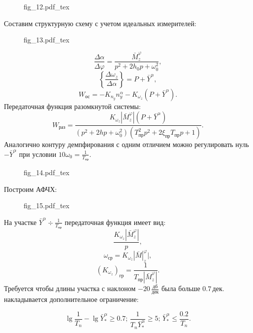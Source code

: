 \documentclass{article}
\begin{document}
\begin{figure}[H]
    \centering
    {fig_12.pdf_tex}
\end{figure}
Составим структурную схему с учетом идеальных измерителей:
\begin{figure}[H]
    \centering
    {fig_13.pdf_tex}
\end{figure}
\[
    \frac{\Delta \alpha}{\Delta \varphi} = \frac{\bar{M}_z^\varphi}{p^2 + 2 h_0
    p + \omega_0^2},
\]
\[
    \left\{ \frac{\Delta \omega_z}{\Delta \alpha}\right\} = P + \bar{Y}^\alpha,
\]
\[
    W_\text{ос} = -K_{n_y} n_y^\alpha - K_{\omega_z} (P + \bar{Y}^\alpha).
\]
Передаточная функция разомкнутой системы:
\[
    W_\text{раз} = \frac{K_{\omega_z} |\bar{M}_z^{\varphi}|(P +
    \bar{Y}^\alpha)}{(p^2 + 2h p + \omega_0^2)(T_\text{пр}^2 p^2 + 2
\xi_\text{пр} T_\text{пр} p + 1)}.
\]
Аналогично контуру демпфирования с одним отличием можно регулировать нуль
$-\bar{Y}^\alpha$ при условии $10 \omega_0 = \frac{1}{T_\text{пр}}$.
\begin{figure}[H]
    \centering
    {fig_14.pdf_tex}
\end{figure}
Построим АФЧХ:
\begin{figure}[H]
    \centering
    {fig_15.pdf_tex}
\end{figure}
На участке $\bar{Y}^\alpha \div \frac{1}{T_\text{пр}}$ передаточная функция
имеет вид:
\[
    \frac{K_{\omega_z}|\bar{M}_z^\varphi|}{p},
\]
\[
    \omega_\text{ср} = K_{\omega_z} |\bar{M}|_z^\varphi|,
\]
\[
    (K_{\omega_z})_\text{гр} = \frac{1}{T_\text{пр} |\bar{M}_z^\varphi|}.
\]
Требуется чтобы длины участка с наклоном $-20 \, \frac{\text{дб}}{\text{дек}}$
была больше $0.7 \, \text{дек}.$ накладывается дополнительное ограничение:

\[
    \lg \frac{1}{T_n} - \lg \bar{Y}^{\alpha}_* \geq 0.7;\, \frac{1}{T_n
    \bar{Y}^{\alpha}_*} \geq 5; \, \bar{Y}^{\alpha}_* \leq \frac{0.2}{T_n}.
\]
\end{document}
